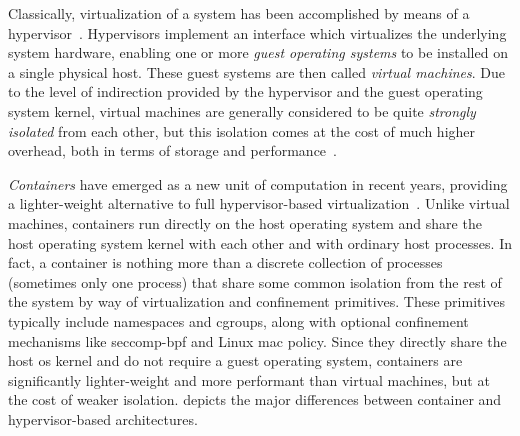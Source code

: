 Classically, virtualization of a system has been accomplished by means of
a hypervisor~\cite{eder2016_hypervisor_container, sultan2019_container_security}.
Hypervisors implement an interface which virtualizes the underlying system hardware,
enabling one or more \textit{guest operating systems} to be installed on a single physical
host. These guest systems are then called \textit{virtual machines}. Due to the level of
indirection provided by the hypervisor and the guest operating system kernel, virtual
machines are generally considered to be quite \textit{strongly isolated} from each other,
but this isolation comes at the cost of much higher overhead, both in terms of storage and
performance~\cite{eder2016_hypervisor_container, sultan2019_container_security}.



\textit{Containers} have emerged as a new unit of computation in recent years, providing
a lighter-weight alternative to full hypervisor-based
virtualization~\cite{sultan2019_container_security, eder2016_hypervisor_container}.
Unlike virtual machines, containers run directly on the host operating system and share
the host operating system kernel with each other and with ordinary host processes. In
fact, a container is nothing more than a discrete collection of processes (sometimes only
one process) that share some common isolation from the rest of the system by way of
virtualization and confinement primitives. These primitives typically include namespaces
and cgroups, along with optional confinement mechanisms like seccomp-\gls{bpf} and Linux
\gls{mac} policy. Since they directly share the host \gls{os} kernel and do not require
a guest operating system, containers are significantly lighter-weight and more performant
than virtual machines, but at the cost of weaker isolation.  depicts the
major differences between container and hypervisor-based architectures.

